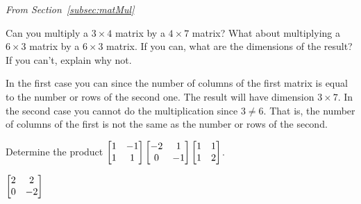 \noindent
{\em From Section~\ref{subsec:matMul}}


\begin{requ}
Can you multiply a $3\times 4$ matrix by a $4\times 7$ matrix?
What about multiplying a $6\times 3$ matrix by a $6\times 3$ matrix.
If you can, what are the dimensions of the result?
If you can't, explain why not.
\begin{requanswer} 
In the first case you can since the number of columns of
the first matrix is equal to the number or rows of the second one.
The result will have dimension $3\times 7$.
In the second case you cannot do the multiplication since $3\neq 6$.
That is, the number of columns of the first is not the same
as the number or rows of the second.
\end{requanswer}
\end{requ}

\begin{requ}
Determine the product $\displaystyle \begin{bmatrix} 1 & -1 \cr 1 &
1\cr\end{bmatrix}\begin{bmatrix}-2 & 1 \cr 0 & -1 \cr
\end{bmatrix}\begin{bmatrix} 1 & 1 \cr 1 & 2 \cr
\end{bmatrix}$.
\begin{requanswer}$\begin{bmatrix} 2 & 2 \cr 0 & -2 \cr
\end{bmatrix}$ 
\end{requanswer}
\end{requ}



